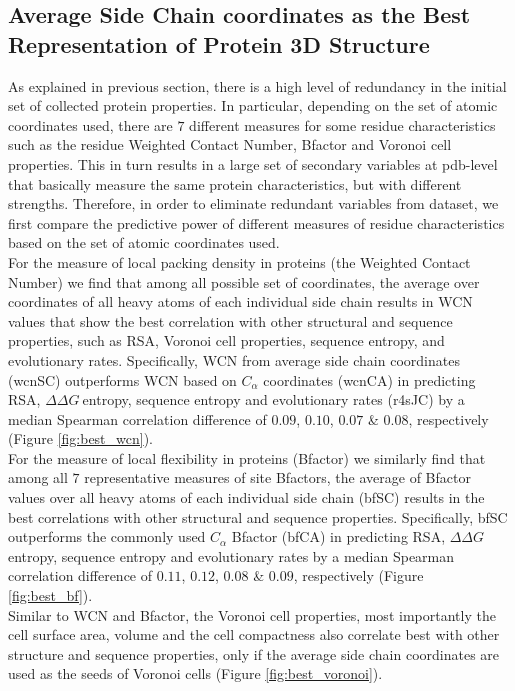 \documentclass[11pt]{article}
\newcommand{\ddg}{$\Delta\Delta G~$}
\begin{document}
    \subsection*{Average Side Chain coordinates as the Best Representation of Protein 3D Structure}

        As explained in previous section, there is a high level of redundancy in the initial set of collected protein properties. In particular, depending on the set of atomic coordinates used, there are $7$ different measures for some residue characteristics such as the residue Weighted Contact Number, Bfactor and Voronoi cell properties. This in turn results in a large set of secondary variables at pdb-level that basically measure the same protein characteristics, but with different strengths.  Therefore, in order to eliminate redundant variables from dataset, we first compare the predictive power of different measures of residue characteristics based on the set of atomic coordinates used.
        \\

        For the measure of local packing density in proteins (the Weighted Contact Number) we find that among all possible set of coordinates, the average over coordinates of all heavy atoms of each individual side chain results in WCN values that show the best correlation with other structural and sequence properties, such as RSA, Voronoi cell properties, sequence entropy, and evolutionary rates. Specifically, WCN from average side chain coordinates (wcnSC) outperforms WCN based on $C_\alpha$ coordinates (wcnCA) in predicting RSA, \ddg entropy, sequence entropy and evolutionary rates (r4sJC) by a median Spearman correlation difference of $0.09$, $0.10$, $0.07$ \& $0.08$, respectively (Figure \ref{fig:best_wcn}).
        \\

        For the measure of local flexibility in proteins (Bfactor) we similarly find that among all $7$ representative measures of site Bfactors, the average of Bfactor values over all heavy atoms of each individual side chain (bfSC) results in the best correlations with other structural and sequence properties. Specifically, bfSC outperforms the commonly used $C_\alpha$ Bfactor (bfCA) in predicting RSA, \ddg entropy, sequence entropy and evolutionary rates by a median Spearman correlation difference of $0.11$, $0.12$, $0.08$ \& $0.09$, respectively (Figure \ref{fig:best_bf}).
        \\

        Similar to WCN and Bfactor, the Voronoi cell properties, most importantly the cell surface area, volume and the cell compactness also correlate best with other structure and sequence properties, only if the average side chain coordinates are used as the seeds of Voronoi cells (Figure \ref{fig:best_voronoi}).
        \\
\end{document}
